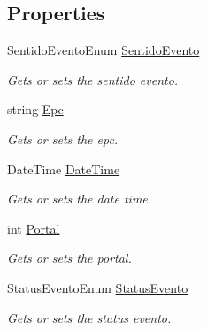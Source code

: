 \subsection*{Properties}
\begin{DoxyCompactItemize}
\item 
Sentido\+Evento\+Enum \hyperlink{class_cruzeiro_1_1_core_1_1_model_1_1_beans_1_1_evento_bean_ad86307ce1f47fc6e9931b0477eb46f5f}{Sentido\+Evento}
\begin{DoxyCompactList}\small\item\em Gets or sets the sentido evento. \end{DoxyCompactList}\item 
string \hyperlink{class_cruzeiro_1_1_core_1_1_model_1_1_beans_1_1_evento_bean_ace771b0d1482e9cb424ea7ec0f821ad2}{Epc}
\begin{DoxyCompactList}\small\item\em Gets or sets the epc. \end{DoxyCompactList}\item 
Date\+Time \hyperlink{class_cruzeiro_1_1_core_1_1_model_1_1_beans_1_1_evento_bean_a60849766788c6c5a6b0acac6d3581f09}{Date\+Time}
\begin{DoxyCompactList}\small\item\em Gets or sets the date time. \end{DoxyCompactList}\item 
int \hyperlink{class_cruzeiro_1_1_core_1_1_model_1_1_beans_1_1_evento_bean_a4c904e1395ad53a521a392c38b03a570}{Portal}
\begin{DoxyCompactList}\small\item\em Gets or sets the portal. \end{DoxyCompactList}\item 
Status\+Evento\+Enum \hyperlink{class_cruzeiro_1_1_core_1_1_model_1_1_beans_1_1_evento_bean_a8c48062d4cb7bf5c51e7063274ca6730}{Status\+Evento}
\begin{DoxyCompactList}\small\item\em Gets or sets the status evento. \end{DoxyCompactList}\end{DoxyCompactItemize}
